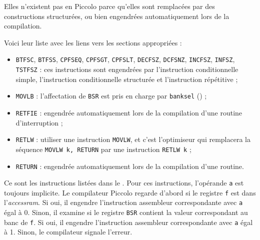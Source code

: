 
Elles n’existent pas en Piccolo parce qu’elles sont remplacées par des constructions structurées, ou bien engendrées automatiquement lors de la compilation.

Voici leur liste avec les liens vers les sections appropriées :\begin{itemize}
  \item \texttt{BTFSC}, \texttt{BTFSS}, \texttt{CPFSEQ}, \texttt{CPFSGT}, \texttt{CPFSLT}, \texttt{DECFSZ}, \texttt{DCFSNZ}, \texttt{INCFSZ}, \texttt{INFSZ}, \texttt{TSTFSZ} : ces instructions sont engendrées par l’instruction conditionnelle simple, l’instruction conditionnelle structurée et l’instruction répétitive ;
  \item \texttt{MOVLB} : l’affectation de \texttt{BSR} est pris en charge par \texttt{banksel} () ;
  \item \texttt{RETFIE} : engendrée automatiquement lors de la compilation d’une routine d’interruption ;
  \item \texttt{RETLW} : utiliser une instruction \texttt{MOVLW}, et c’est l’optimiseur qui remplacera la séquence \texttt{MOVLW k, RETURN} par une instruction \texttt{RETLW k} ;
  \item \texttt{RETURN} : engendrée automatiquement lors de la compilation d’une routine.

\end{itemize}








Ce sont les instructions listées dans le . Pour ces instructions, l'opérande \texttt{a} est toujours implicite. Le compilateur Piccolo regarde d'abord si le registre \texttt{f} est dans l'\emph{accessram}. Si oui, il engendre l'instruction assembleur correspondante avec \texttt{a} égal à 0. Sinon, il examine si le registre \texttt{BSR} contient la valeur correspondant au banc de \texttt{f}. Si oui, il engendre l'instruction assembleur correspondante avec \texttt{a} égal à 1. Sinon, le compilateur signale l'erreur.



